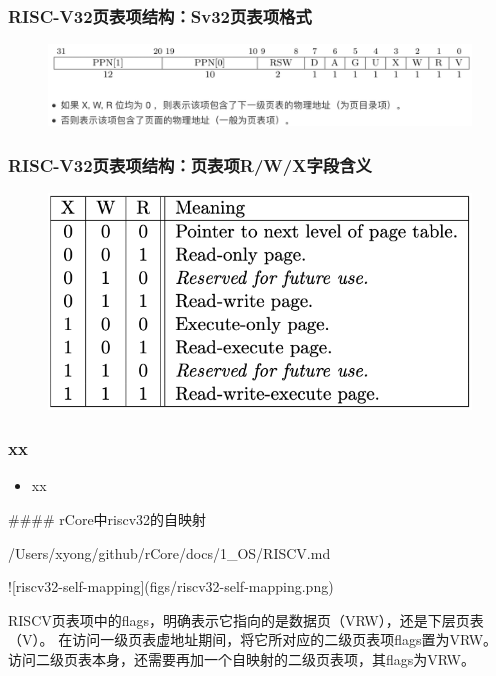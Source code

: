 % 
\begin{frame}
    \frametitle{RISC-V32页表项结构：Sv32页表项格式}
        \begin{figure}
        \includegraphics[width=1.0\linewidth]{figs/riscv32-page-entry.png}
        \end{figure}
\end{frame}
\begin{frame}
    \frametitle{RISC-V32页表项结构：页表项R/W/X字段含义}

        \begin{figure}
        \includegraphics[width=0.9\linewidth]{figs/PTE-RWX-fields.png}
        \end{figure}

\end{frame}
% 
% 
% 
% 
\begin{frame}
    \frametitle{xx}
    \begin{itemize}
        \item xx
    \end{itemize}
\end{frame}
#### rCore中riscv32的自映射

/Users/xyong/github/rCore/docs/1_OS/RISCV.md

![riscv32-self-mapping](figs/riscv32-self-mapping.png)

RISCV页表项中的flags，明确表示它指向的是数据页（VRW），还是下层页表（V）。
在访问一级页表虚地址期间，将它所对应的二级页表项flags置为VRW。
访问二级页表本身，还需要再加一个自映射的二级页表项，其flags为VRW。

